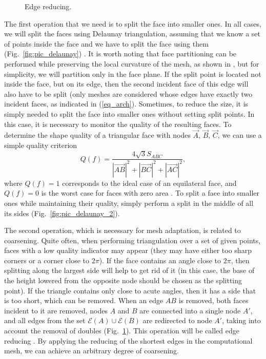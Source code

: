 \documentclass[
11pt,
tightenlines,
twoside,
onecolumn,
nofloats,
nobibnotes,
nofootinbib,
superscriptaddress,
noshowpacs,
centertags]
{revtex4}
\begin{document}
\begin{figure}[h]
\begin{minipage}[h]{0.28\textwidth}
    \caption{Edge reducing.}\label{fig:pic_reduce_edge}
  \end{minipage}
\end{figure}

The first operation that we need is to split the face into smaller ones.
In all cases, we will split the faces using Delaunay triangulation, assuming that we know a set of points inside the face and we have to split the face using them (Fig.~\ref{fig:pic_delaunay}) \cite{Rivara}.
It is worth noting that face partitioning can be performed while preserving the local curvature of the mesh, as shown in \cite{Rakotoarivelo}, but for simplicity, we will partition only in the face plane.
If the split point is located not inside the face, but on its edge, then the second incident face of this edge will also have to be split (only meshes are considered whose edges have exactly two incident faces, as indicated in (\ref{eq_arch}).
Sometimes, to reduce the size, it is simply needed to split the face into smaller ones without setting split points.
In this case, it is necessary to monitor the quality of the resulting faces.
To determine the shape quality of a triangular face with nodes
$\vec{A}$, $\vec{B}$, $\vec{C}$, we can use a simple quality
criterion
\begin{equation*}
Q(f) = \frac{4\sqrt{3} S_{ABC}}{|\vec{AB}|^2 + |\vec{BC}|^2 +
|\vec{AC}|^2},
\end{equation*}
where $Q(f) = 1$ corresponds to the ideal case of an equilateral
face, and $Q(f) = 0$ is the worst case for faces with zero area
\cite{Borouchaki}.
To split a face into smaller ones while maintaining their quality, simply perform a split in the middle of all its sides (Fig.~\ref{fig:pic_delaunay_2}).

The second operation, which is necessary for mesh adaptation, is related to coarsening.
Quite often, when performing triangulation over a set of given points, faces with a low quality indicator may appear (they may have either too sharp corners or a corner close to $2 \pi$).
If the face contains an angle close to $2 \pi$, then splitting along the largest side will help to get rid of it (in this case, the base of the height lowered from the opposite node should be chosen as the splitting point).
If the triangle contains only close to acute angles, then it has a side that is too short, which can be removed.
When an edge $AB$ is removed, both faces incident to it are removed, nodes $A$ and $B$ are connected into a single node $A'$, and all edges from the set $\mathscr{E}(A) \cup \mathscr{E} (B)$ are redirected to node $A'$, taking into account the removal of doubles (Fig.~\ref{fig:pic_reduce_edge}).
This operation will be called edge reducing \cite{Panchal}.
By applying the reducing of the shortest edges in the  computational
mesh, we can achieve an arbitrary degree of coarsening.
\end{document}

